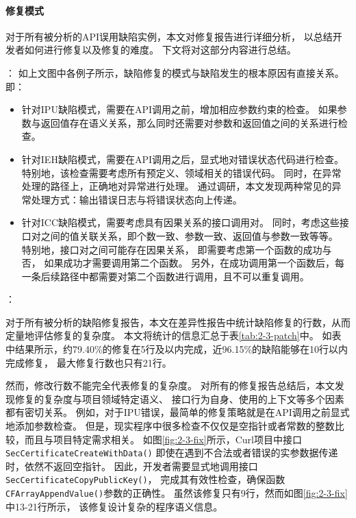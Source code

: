 \paragraph{修复模式}
对于所有被分析的API误用缺陷实例，本文对修复报告进行详细分析，
以总结开发者如何进行修复以及修复的难度。
下文将对这部分内容进行总结。

{}：
如上文图中各例子所示，缺陷修复的模式与缺陷发生的根本原因有直接关系。即：
\begin{itemize}
	\item 针对IPU缺陷模式，需要在API调用之前，增加相应参数约束的检查。
	如果参数与返回值存在语义关系，那么同时还需要对参数和返回值之间的关系进行检查。
	\item 针对IEH缺陷模式，需要在API调用之后，显式地对错误状态代码进行检查。
	特别地，该检查需要考虑所有预定义、领域相关的错误代码。
	同时，在异常处理的路径上，正确地对异常进行处理。
	通过调研，本文发现两种常见的异常处理方式：输出错误日志与将错误状态向上传递。
	\item 针对ICC缺陷模式，需要考虑具有因果关系的接口调用对。
	同时，考虑这些接口对之间的值关联关系，即个数一致、参数一致、返回值与参数一致等等。
	特别地，接口对之间可能存在因果关系，
	即需要考虑第一个函数的成功与否，
	如果成功才需要调用第二个函数。
	另外，在成功调用第一个函数后，每一条后续路径中都需要对第二个函数进行调用，且不可以重复调用。
\end{itemize}

{}：

对于所有被分析的缺陷修复报告，本文在差异性报告中统计缺陷修复的行数，从而定量地评估修复的复杂度。
本文将统计的信息汇总于表\ref{tab:2-3-patch}中。
如表中结果所示，约79.40\%的修复在5行及以内完成，近96.15\%的缺陷能够在10行以内完成修复，
最大修复行数也只有21行。



然而，修改行数不能完全代表修复的复杂度。
对所有的修复报告总结后，本文发现修复的复杂度与项目领域特定语义、
接口行为自身、使用的上下文等多个因素都有密切关系。
例如，对于IPU错误，最简单的修复策略就是在API调用之前显式地添加参数检查。
但是，现实程序中很多检查不仅仅是空指针或者常数的整数比较，而且与项目特定需求相关。
如图\ref{fig:2-3-fix}所示，Curl项目中接口\texttt{SecCertificateCreateWithData()}
即使在遇到不合法或者错误的实参数据传递时，依然不返回空指针。
因此，开发者需要显式地调用接口\texttt{SecCertificateCopyPublicKey()}，
完成其有效性检查，确保函数\texttt{CFArrayAppendValue()}参数的正确性。
虽然该修复只有9行，然而如图\ref{fig:2-3-fix}中13-21行所示，
该修复设计复杂的程序语义信息。



